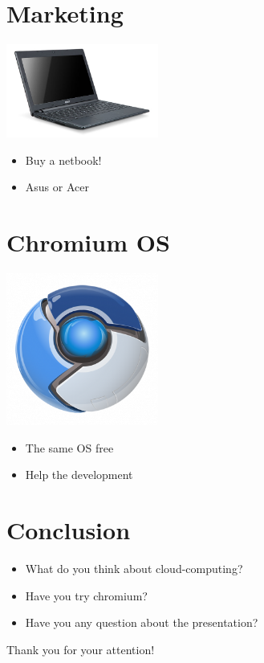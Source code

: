 \documentclass{beamer}
\begin{document}
\section{Marketing}
\begin{frame}
\includegraphics[width=5cm]{acer-chromebook.jpg}
\begin{itemize}
	\item Buy a netbook!
	\item Asus or Acer
\end{itemize}
\end{frame}
\section{Chromium OS}
\begin{frame}
\includegraphics[width=5cm]{chromium.png}
\begin{itemize}
	\item The same OS free 
	\item Help the development 
\end{itemize}
\end{frame}
\section{Conclusion}
\begin{frame}
\begin{itemize}
	\item What do you think about cloud-computing? 
	\item Have you try chromium? 
	\item Have you any question about the presentation?
\end{itemize}
\end{frame}
\begin{frame}
	Thank you for your attention!
\end{frame}
\end{document}
